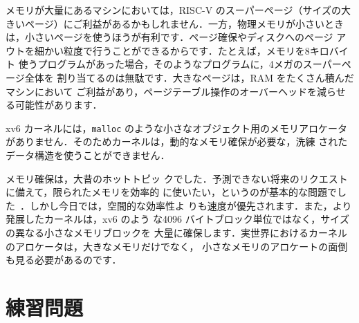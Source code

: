 メモリが大量にあるマシンにおいては，RISC-V のスーパーページ（サイズの大
きいページ）にご利益があるかもしれません．一方，物理メモリが小さいとき
は，小さいページを使うほうが有利です．ページ確保やディスクへのページ
アウトを細かい粒度で行うことができるからです．たとえば，メモリを8キロバイト
使うプログラムがあった場合，そのようなプログラムに，4メガのスーパーページ全体を
割り当てるのは無駄です．大きなページは，RAM をたくさん積んだマシンにおいて
ご利益があり，ページテーブル操作のオーバーヘッドを減らせる可能性があります．


xv6 カーネルには，\texttt{malloc} のような小さなオブジェクト用のメモリアロケータ
がありません．そのためカーネルは，動的なメモリ確保が必要な，洗練
されたデータ構造を使うことができません．

メモリ確保は，大昔のホットトピッ
クでした．予測できない将来のリクエストに備えて，限られたメモリを効率的
に使いたい，というのが基本的な問題でした~\cite{knuth}．しかし今日では，空間的な効率性よ
りも速度が優先されます．また，より発展したカーネルは，xv6 のよう
な4096 バイトブロック単位ではなく，サイズの異なる小さなメモリブロックを
大量に確保します．実世界におけるカーネルのアロケータは，大きなメモリだけでなく，
小さなメモリのアロケートの面倒も見る必要があるのです．

\section{練習問題}

